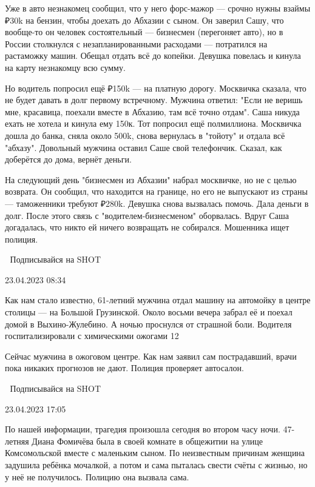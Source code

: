 \documentclass{article}
\begin{document}
\begin{multicols}{3}
Уже в авто незнакомец сообщил, что у него форс-мажор — срочно нужны взаймы ₽30k на бензин, чтобы доехать до Абхазии с сыном. Он заверил Сашу, что вообще-то он человек состоятельный — бизнесмен (перегоняет авто), но в России столкнулся с незапланированными расходами — потратился на растаможку машин. Обещал отдать всё до копейки. Девушка повелась и кинула на карту незнакомцу всю сумму.

Но водитель попросил ещё ₽150k — на платную дорогу. Москвичка сказала, что не будет давать в долг первому встречному. Мужчина ответил: "Если не веришь мне, красавица, поехали вместе в Абхазию, там всё точно отдам". Саша никуда ехать не хотела и кинула ему 150к. Тот попросил ещё полмиллиона. Москвичка дошла до банка, сняла около 500k, снова вернулась в "тойоту" и отдала всё "абхазу". Довольный мужчина оставил Саше свой телефончик. Сказал, как доберётся до дома, вернёт деньги. 

На следующий день "бизнесмен из Абхазии" набрал москвичке, но не с целью возврата. Он сообщил, что находится на границе, но его не выпускают из страны — таможенники требуют ₽280k. Девушка снова вызвалась помочь. Дала деньги в долг. После этого связь с "водителем-бизнесменом" оборвалась. Вдруг Саша догадалась, что никто ей ничего возвращать не собирался. Мошенника ищет полиция.

🎯 Подписывайся на SHOT

23.04.2023 08:34\closearticle
{}


Как нам стало известно, 61-летний мужчина отдал машину на автомойку в центре столицы — на Большой Грузинской. Около восьми вечера забрал её и поехал домой в Выхино-Жулебино. А ночью проснулся от страшной боли. Водителя госпитализировали с химическими ожогами 12%

Сейчас мужчина в ожоговом центре. Как нам заявил сам пострадавший, врачи пока никаких прогнозов не дают. Полиция проверяет автосалон.

🎯 Подписывайся на SHOT

23.04.2023 17:05\closearticle
{}


По нашей информации, трагедия произошла сегодня во втором часу ночи. 47-летняя Диана Фомичёва была в своей комнате в общежитии на улице Комсомольской вместе с маленьким сыном. По неизвестным причинам женщина задушила ребёнка мочалкой, а потом и сама пыталась свести счёты с жизнью, но у неё не получилось. Полицию она вызвала сама.


\end{multicols}
\end{document}
